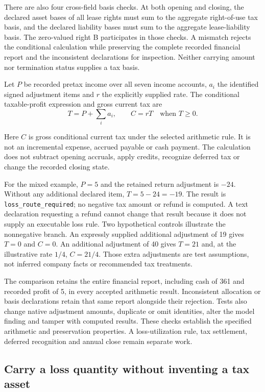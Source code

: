 There are also four cross-field basis checks. At both opening and closing,
the declared asset bases of all lease rights must sum to the aggregate
right-of-use tax basis, and the declared liability bases must sum to the
aggregate lease-liability basis. The zero-valued right B participates in those
checks. A mismatch rejects the conditional calculation while preserving the
complete recorded financial report and the inconsistent declarations for
inspection. Neither carrying amount nor termination status supplies a tax basis.

\begin{samepage}
Let $P$ be recorded pretax income over all seven income accounts, $a_i$ the
identified signed adjustment items and $r$ the explicitly supplied rate. The
conditional taxable-profit expression and gross current tax are
\[
 T=P+\sum_i a_i,
 \qquad
 C=rT\quad\text{when }T\geq0.
\]
\end{samepage}
Here $C$ is gross conditional current tax under the selected arithmetic rule.
It is not an incremental expense, accrued payable or cash payment. The
calculation does not subtract opening accruals, apply credits, recognize
deferred tax or change the recorded closing state.

For the mixed example, $P=5$ and the retained return adjustment is $-24$.
Without any additional declared item, $T=5-24=-19$. The result is
\texttt{loss\_route\_required}; no negative tax amount or refund is computed.
A text declaration requesting a refund cannot change that result because it
does not supply an executable loss rule. Two hypothetical controls illustrate
the nonnegative branch. An expressly supplied additional adjustment of 19 gives
$T=0$ and $C=0$. An additional adjustment of 40 gives $T=21$ and, at the
illustrative rate $1/4$, $C=21/4$. Those extra adjustments are test assumptions,
not inferred company facts or recommended tax treatments.

The comparison retains the entire financial report, including cash of 361 and
recorded profit of 5, in every accepted arithmetic result. Inconsistent allocation
or basis declarations retain that same report alongside their rejection. Tests
also change native adjustment amounts, duplicate or omit identities, alter the
model finding and tamper with computed results. These checks establish the
specified arithmetic and preservation properties. A loss-utilization rule,
tax settlement, deferred recognition and annual close remain separate work.

\subsection{Carry a loss quantity without inventing a tax asset}

